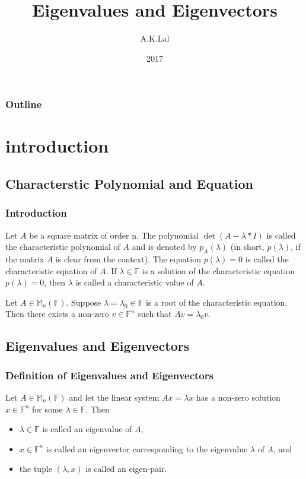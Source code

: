 \documentclass[10pt]{beamer}
\title{Eigenvalues and Eigenvectors}
\author{A.K.Lal}
\institute{IIT Kanpur}
\date{2017}
\begin{document}
\maketitle
\begin{frame}
\frametitle{Outline}
\tableofcontents
\end{frame}
\section{introduction}
\subsection{Characterstic Polynomial and Equation
}
 
\begin{frame}
\frametitle{Introduction}
\begin{definition}
Let $A$ be a square matrix of order n. The polynomial $ \det (A - \lambda*I)$ is called the characteristic polynomial of $A$ and is denoted by $p_A(\lambda)$ (in short, $p(\lambda)$, if the matrix $A$ is clear from the context). The equation $p(\lambda) = 0$ is called the characteristic equation of $A$. If $\lambda \in \mathbb{F}$ is a solution of the characteristic equation $p(\lambda) = 0$, then $\lambda$ is called a characteristic value of $A$. 

\end{definition}
\begin{theorem}
Let $A \in \mathbb{M}_n(\mathbb{F})$. Suppose $\lambda = \lambda_0 \in \mathbb{F}$ is a root of the characteristic equation. Then
there exists a non-zero $v \in \mathbb{F}^n$ such that $Av = \lambda_0 v$.
\end{theorem}
\end{frame}
\subsection{Eigenvalues and Eigenvectors}
\begin{frame}
\frametitle{Definition of Eigenvalues and Eigenvectors}
\begin{definition}
Let $A \in \mathbb{M}_n (\mathbb{F})$ and let the linear system $Ax = \lambda x$ has a non-zero solution $x \in \mathbb{F}^n$ for some $\lambda \in \mathbb{F}$. Then
\begin{itemize}
\item $\lambda \in \mathbb{F}$ is called an eigenvalue of $A$,
\item $ x \in \mathbb{F}^n$ is called an eigenvector corresponding to the eigenvalue $\lambda$ of $A$, and
\item the tuple $(\lambda, x)$ is called an eigen-pair.
\end{itemize}
\end{definition}
\end{frame}
\end{document}
